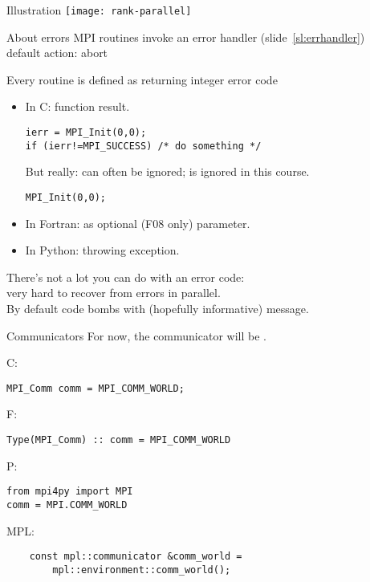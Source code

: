 \begin{exerciseframe}[commrank]
  
\end{exerciseframe}

\begin{numberedframe}{Illustration}
  \texttt{[image: rank-parallel]}
\end{numberedframe}

\begin{numberedframe}{About errors}
  MPI routines invoke an error handler (slide~\ref{sl:errhandler})\\
  default action: abort
  
  Every routine is defined as returning integer error code
  \begin{itemize}
  \item In C: function result. 
\lstset{language=C++}
\begin{lstlisting}
ierr = MPI_Init(0,0);
if (ierr!=MPI_SUCCESS) /* do something */
\end{lstlisting}
  But really: can often be ignored; is ignored in this course.
\begin{lstlisting}
MPI_Init(0,0);
\end{lstlisting}
  \item In Fortran: as optional (F08 only) parameter.
  \item In Python: throwing exception.
  \end{itemize}
  There's not a lot you can do with an error code:\\
  very hard to recover from errors in parallel.\\
  By default code bombs with (hopefully informative) message.
\end{numberedframe}

\begin{numberedframe}{Communicators}
  \label{sl:mpi-comm-world}
  For now, the communicator will be .

  C:
  \lstset{language=C}
\begin{lstlisting}
MPI_Comm comm = MPI_COMM_WORLD;
\end{lstlisting}

  F:
  \lstset{language=Fortran}
\begin{lstlisting}
Type(MPI_Comm) :: comm = MPI_COMM_WORLD
\end{lstlisting}

  P:
  \lstset{language=Python}
\begin{lstlisting}
from mpi4py import MPI
comm = MPI.COMM_WORLD
\end{lstlisting}

  MPL:
  \lstset{language=C++}
\begin{lstlisting}
    const mpl::communicator &comm_world =
        mpl::environment::comm_world();
\end{lstlisting}
\end{numberedframe}


